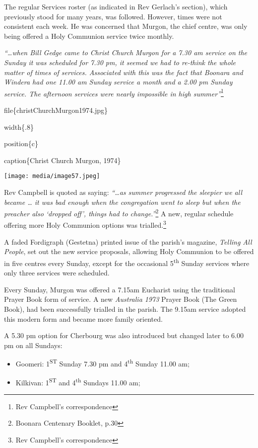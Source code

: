 The regular Services roster (as indicated in Rev Gerlach's section), which previously stood for many years, was followed. However, times were not consistent each week. He was concerned that Murgon, the chief centre, was only being offered a Holy Communion service twice monthly.

\emph{``\ldots when Bill Gedge came to Christ Church Murgon for a 7.30 am service on the Sunday it was scheduled for 7.30 pm, it seemed we had to re-think the whole matter of times of services. Associated with this was the fact that Boonara and Windera had one 11.00 am Sunday service a month and a 2.00 pm Sunday service. The afternoon services were nearly impossible in high summer''}\footnote{Rev Campbell's correspondence}

file\{christChurchMurgon1974.jpg\}

width\{.8\}

position\{c\}

caption\{Christ Church Murgon, 1974\}

\texttt{[image: media/image57.jpeg]}

Rev Campbell is quoted as saying: \emph{``\ldots as summer progressed the sleepier we all became \ldots{} it was bad enough when the congregation went to sleep but when the preacher also `dropped off', things had to change.''}\footnote{Boonara Centenary Booklet, p.30} A new, regular schedule offering more Holy Communion options was trialled.\footnote{Rev Campbell's correspondence}

A faded Fordigraph (Gestetna) printed issue of the parish's magazine, \emph{Telling All People}, set out the new service proposals, allowing Holy Communion to be offered in five centres every Sunday, except for the occasional 5\textsuperscript{th} Sunday services where only three services were scheduled.

Every Sunday, Murgon was offered a 7.15am Eucharist using the traditional Prayer Book form of service. A new \emph{Australia 1973} Prayer Book (The Green Book), had been successfully trialled in the parish. The 9.15am service adopted this modern form and became more family oriented.

A 5.30 pm option for Cherbourg was also introduced but changed later to 6.00 pm on all Sundays:

\begin{itemize}
\item
  Goomeri: 1\textsuperscript{ST} Sunday 7.30 pm and 4\textsuperscript{th} Sunday 11.00 am;
\item
  Kilkivan: 1\textsuperscript{ST} and 4\textsuperscript{th} Sundays 11.00 am;
\end{itemize}

